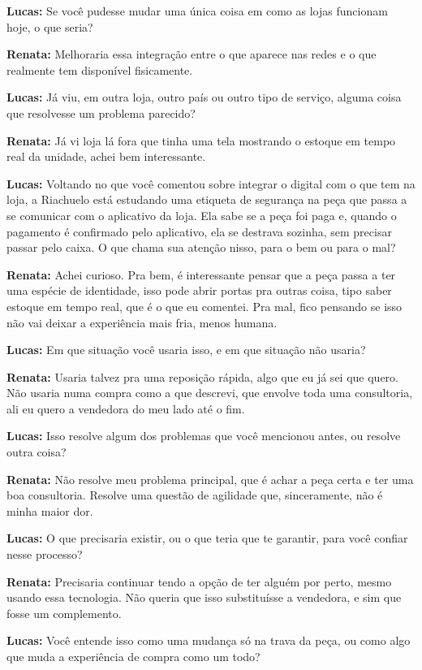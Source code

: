 \textbf{Lucas:} Se você pudesse mudar uma única coisa em como as lojas funcionam hoje, o que seria?

\textbf{Renata:} Melhoraria essa integração entre o que aparece nas redes e o que realmente tem disponível fisicamente.

\textbf{Lucas:} Já viu, em outra loja, outro país ou outro tipo de serviço, alguma coisa que resolvesse um problema parecido?

\textbf{Renata:} Já vi loja lá fora que tinha uma tela mostrando o estoque em tempo real da unidade, achei bem interessante.

\textbf{Lucas:} Voltando no que você comentou sobre integrar o digital com o que tem na loja, a Riachuelo está estudando uma etiqueta de segurança na peça que passa a se comunicar com o aplicativo da loja. Ela sabe se a peça foi paga e, quando o pagamento é confirmado pelo aplicativo, ela se destrava sozinha, sem precisar passar pelo caixa. O que chama sua atenção nisso, para o bem ou para o mal?

\textbf{Renata:} Achei curioso. Pra bem, é interessante pensar que a peça passa a ter uma espécie de identidade, isso pode abrir portas pra outras coisa, tipo saber estoque em tempo real, que é o que eu comentei. Pra mal, fico pensando se isso não vai deixar a experiência mais fria, menos humana.

\textbf{Lucas:} Em que situação você usaria isso, e em que situação não usaria?

\textbf{Renata:} Usaria talvez pra uma reposição rápida, algo que eu já sei que quero. Não usaria numa compra como a que descrevi, que envolve toda uma consultoria, ali eu quero a vendedora do meu lado até o fim.

\textbf{Lucas:} Isso resolve algum dos problemas que você mencionou antes, ou resolve outra coisa?

\textbf{Renata:} Não resolve meu problema principal, que é achar a peça certa e ter uma boa consultoria. Resolve uma questão de agilidade que, sinceramente, não é minha maior dor.

\textbf{Lucas:} O que precisaria existir, ou o que teria que te garantir, para você confiar nesse processo?

\textbf{Renata:} Precisaria continuar tendo a opção de ter alguém por perto, mesmo usando essa tecnologia. Não queria que isso substituísse a vendedora, e sim que fosse um complemento.

\textbf{Lucas:} Você entende isso como uma mudança só na trava da peça, ou como algo que muda a experiência de compra como um todo?

